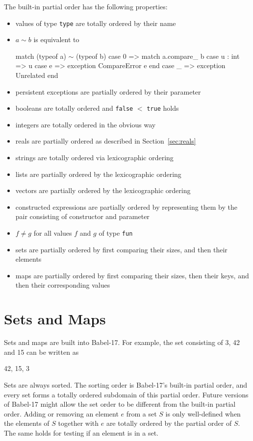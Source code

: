 \documentclass[11pt]{amsart}
\newcommand{\babelsrc}[1] {\lstinline!#1!}
\begin{document}
The built-in partial order has the following properties:
\begin{itemize}
\item values of type \texttt{type} are totally ordered by their name
\item $a \sim b$ is equivalent to
\begin{babellisting}
match (typeof a) $\sim$ (typeof b)
  case 0 => 
    match a.compare_ b
      case u : int => u
      case e => exception CompareError e
    end
  case _ => exception Unrelated
end
\end{babellisting}
\item persistent exceptions are partially ordered by their parameter 
 \item booleans are totally ordered and \babelsrc{false} $<$ \babelsrc{true} holds
 \item integers are totally ordered in the obvious way
  \item reals are partially ordered as described in Section~\ref{sec:reals}
\item strings are totally ordered via lexicographic ordering
\item lists are partially ordered by the lexicographic ordering 
\item vectors are partially ordered by the lexicographic ordering 
\item constructed expressions are partially ordered by representing them by the pair consisting of constructor and parameter
\item $f \neq g$ for all values $f$ and $g$ of type \texttt{fun}
\item sets are partially ordered by first comparing their sizes, and then their elements 
\item maps are partially ordered by first comparing their sizes, then their keys, and then their corresponding values
\end{itemize}

\section{Sets and Maps}\label{sec:setsandmaps}
Sets and maps are built into Babel-17. For example, the set consisting of 3, 42 and 15 can be written as
\begin{babellisting}
{42, 15, 3}
\end{babellisting}
Sets are always sorted. The sorting order is Babel-17's built-in partial order, and every set forms a totally ordered subdomain of this partial order. Future versions of Babel-17 might allow the set order to be different from the built-in partial order. Adding or removing an element $e$ from a set $S$ is only well-defined when the elements of $S$ together with $e$ are totally ordered by the partial order of $S$. The same holds for testing if an element is in a set. 
\end{document}
